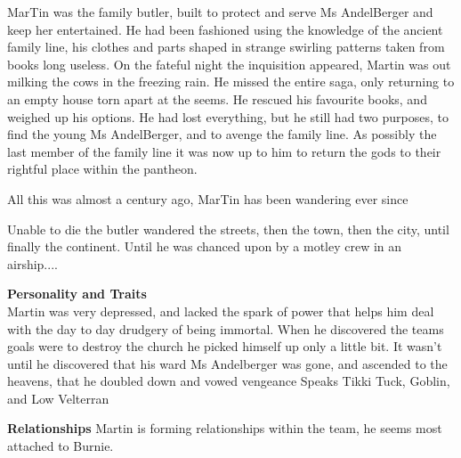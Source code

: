 MarTin was the family butler, built to protect and serve Ms AndelBerger and keep her entertained. He had been fashioned using the knowledge of the ancient family line, his clothes and parts shaped in strange swirling patterns taken from books long useless. On the fateful night the inquisition appeared, Martin was out milking the cows in the freezing rain. He missed the entire saga, only returning to an empty house torn apart at the seems. He rescued his favourite books, and weighed up his options. He had lost everything, but he still had two purposes, to find the young Ms AndelBerger, and to avenge the family line. As possibly the last member of the family line it was now up to him to return the gods to their rightful place within the pantheon.    \medskip

All this was almost a century ago, MarTin has been wandering ever since    \medskip

Unable to die the butler wandered the streets, then the town, then the city, until finally the continent. Until he was chanced upon by a motley crew in an airship....     

\textbf{Personality and Traits}\\
Martin was very depressed, and lacked the spark of power that helps him deal with the day to day drudgery of being immortal. When he discovered the teams goals were to destroy the church he picked himself up only a little bit. It wasn't until he discovered that his ward Ms Andelberger was gone, and ascended to the heavens, that he doubled down and vowed vengeance
Speaks Tikki Tuck, Goblin, and Low Velterran    

\textbf{Relationships}
Martin is forming relationships within the team, he seems most attached to Burnie.\bigskip

\clearpage